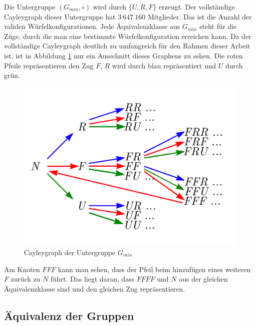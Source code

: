 \documentclass[12pt,a4paper, usenames, dvipsnames]{article}
\theoremstyle{mystyle}
\theoremstyle{definition}
\newcommand{\Gtwo}{\ensuremath{G_{2\times 2\times 2}}}
\newcommand{\Ttwo}{2$\times$2$\times$2-}
\begin{document}
Die Untergruppe $(G_{min}, \circ)$ wird durch $\{U, R, F\}$ erzeugt. Der vollständige Cayleygraph dieser Untergruppe hat  $3 \ 647 \ 160$ Mitglieder. Das ist die Anzahl der validen Würfelkonfigurationen. Jede Äquivalenzklasse aus $G_{min}$ steht für die Züge, durch die man eine bestimmte Würfelkonfiguration erreichen kann.
Da der vollständige Cayleygraph deutlich zu umfangreich für den Rahmen dieser Arbeit ist, 
ist in Abbildung \ref{Abbildung_Cayleygraph_min} nur ein Ausschnitt dieses Graphens zu sehen. Die roten Pfeile repräsentieren den Zug $F$, $R$ wird durch blau repräsentiert und $U$ durch grün. 

\begin{figure}[H]
\centering
\includegraphics[scale=0.9]{Cayleygraph_URF.png}
\caption{Cayleygraph der Untergruppe $G_{min}$}
\label{Abbildung_Cayleygraph_min}
\end{figure}

Am Knoten $FFF$ kann man sehen, dass der Pfeil beim hinzufügen eines weiteren $F$ zurück zu $N$ führt. Das liegt daran, dass $FFFF$ und $N$ aus der gleichen Äquivalenzklasse sind und den gleichen Zug repräsentieren.
 



%
%
%
%
%
%
%
%
%
%
%
%
%
%
%
%
%
%
\subsection{Äquivalenz der Gruppen}

\end{document}
